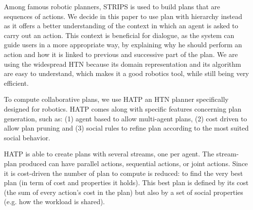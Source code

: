 \documentclass{llncs}
\begin{document}



Among famous robotic planners, STRIPS \cite{strips71} is used to build plans that are sequences of actions. We decide in this paper to use plan with hierarchy instead as it offers a better understanding of the context in which an agent is asked to carry out an action. This context is beneficial for dialogue, as the system can guide users in a more appropriate way, by explaining why he should perform an action and how it is linked to previous and successive part of the plan. 
We are using the widespread HTN because its domain representation and its algorithm are easy to understand, which makes it a good robotics tool, while still being very efficient. 



To compute collaborative plans, we use HATP \cite{lallement14} an HTN planner specifically designed for robotics.
HATP comes along with specific features concerning plan generation, such as: (1) agent based to allow multi-agent plans, (2) cost driven to allow plan pruning and (3) social rules to refine plan according to the most suited social behavior.

HATP is able to create plans with several streams, one per agent. The stream-plan produced can have parallel actions, sequential actions, or joint actions. 
Since it is cost-driven the number of plan to compute is reduced: to find the very best plan (in term of cost and properties it holds). 
This best plan is defined by its cost (the sum of every action's cost in the plan) but also by a set of social properties (e.g. how the workload is shared).
\end{document}
